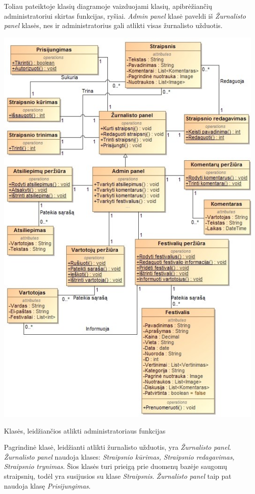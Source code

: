 ﻿\documentclass{VUMIFPSkursinis}
\begin{document}
Toliau pateiktoje klasių diagramoje vaizduojami klasių, apibrėžiančių administratoriui skirtas funkcijas, ryšiai. \textit{Admin panel} klasė paveldi iš \textit{Žurnalisto panel} klasės, nes ir administratorius gali atlikti visas žurnalisto užduotis.
\begin{center}
    \includegraphics[scale=0.5]{img/PSI3/admin}
	\label{img:uml18}
	\caption{Klasės, leidžiančios atlikti administratoriaus funkcijas}
\end{center}
Pagrindinė klasė, leidžianti atlikti žurnalisto užduotis, yra \textit{Žurnalisto panel}. \textit{Žurnalisto panel} naudoja klases: \textit{Straipsnio kūrimas, Straipsnio redagavimas, Straipsnio trynimas}. Šios klasės turi prieigą prie duomenų bazėje saugomų straipsnių, todėl yra susijusios su klase \textit{Straipsnis}. \textit{Žurnalisto panel} taip pat naudoja klasę \textit{Prisijungimas}.
\end{document}
